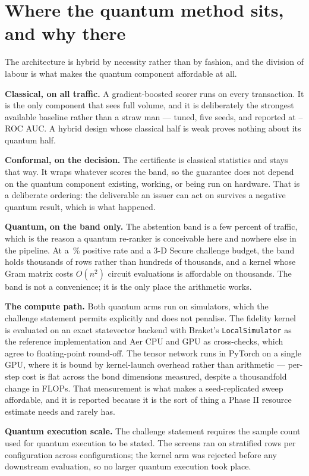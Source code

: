 \section{Where the quantum method sits, and why there}

The architecture is hybrid by necessity rather than by fashion, and the division of labour is
what makes the quantum component affordable at all.

\textbf{Classical, on all traffic.} A gradient-boosted scorer runs on every transaction. It is
the only component that sees full volume, and it is deliberately the strongest available
baseline rather than a straw man --- tuned, five seeds, and reported at
\ClaimGbdtFullAucMin--\ClaimGbdtFullAucMax{} ROC AUC. A hybrid design whose classical half is
weak proves nothing about its quantum half.

\textbf{Conformal, on the decision.} The certificate is classical statistics and stays that
way. It wraps whatever scores the band, so the guarantee does not depend on the quantum
component existing, working, or being run on hardware. That is a deliberate ordering: the
deliverable an issuer can act on survives a negative quantum result, which is what happened.

\textbf{Quantum, on the band only.} The abstention band is a few percent of traffic, which is
the reason a quantum re-ranker is conceivable here and nowhere else in the pipeline. At a
\ClaimTestFraudRate\,\% positive rate and a 3-D Secure challenge budget, the band holds
thousands of rows rather than hundreds of thousands, and a kernel whose Gram matrix costs
$O(n^2)$ circuit evaluations is affordable on thousands. The band is not a convenience; it is
the only place the arithmetic works.

\textbf{The compute path.} Both quantum arms run on simulators, which the challenge statement
permits explicitly and does not penalise. The fidelity kernel is evaluated on an exact
statevector backend with Braket's \texttt{LocalSimulator} as the reference implementation and
Aer CPU and GPU as cross-checks, which agree to floating-point round-off. The tensor network runs
in PyTorch on a single GPU, where it is bound by kernel-launch overhead rather than arithmetic
--- per-step cost is flat across the bond dimensions measured, despite a thousandfold
change in FLOPs. That measurement is what makes a seed-replicated sweep affordable, and it is reported
because it is the sort of thing a Phase II resource estimate needs and rarely has.

\textbf{Quantum execution scale.} The challenge statement requires the sample count used for
quantum execution to be stated. The screens ran on \ClaimScreenSamples{} stratified rows per
configuration across \ClaimScreenConfigs{} configurations; the kernel arm was rejected before
any downstream evaluation, so no larger quantum execution took place.
